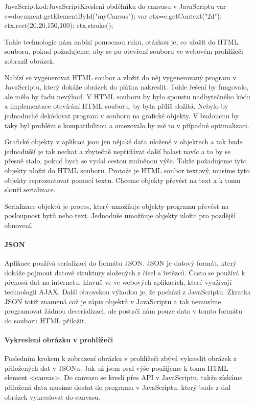 \documentclass[
  field=inf,
  biblatex,
  glossaries,
  index
]{kidiplom}
\begin{document}
\begin{kicode}{JavaScript}{kod:JavaScript}{Kreslení obdélníku do canvasu v JavaScriptu}
var c=document.getElementById("myCanvas");
var ctx=c.getContext("2d");
ctx.rect(20,20,150,100);
ctx.stroke();
\end{kicode}

Tahle technologie nám nabízí pomocnou ruku, otázkou je, co uložit do HTML souboru, pokud požadujeme, aby se po otevření souboru ve webovém prohlížeči zobrazil obrázek.

Nabízí se vygenerovat HTML soubor a vložit do něj vygenerovaný program v JavaScriptu, který dokáže obrázek do plátna nakreslit. Tohle řešení by fungovalo, ale mělo by řadu nevýhod. V HTML souboru by bylo spoustu nadbytečného kódu a implementace otevírání HTML souboru, by byla příliš složitá. Nebylo by jednoduché dekódovat program v souboru na grafické objekty. V budoucnu by taky byl problém s kompatibilitou a omezovalo by mě to v případné optimalizaci.

Grafické objekty v aplikaci jsou jen nějaké data uložené v objektech a tak bude jednodušší je tak nechat a zbytečně nepřidávat další balast navíc a to by se přesně stalo, pokud bych se vydal cestou zmíněnou výše. Takže požadujeme tyto objekty uložit do HTML souboru. Protože je HTML soubor textový, musíme tyto objekty reprezentovat pomocí textu. Chceme objekty převést na text a k tomu slouží serializace.

Serializace objektů je proces, který umožňuje objekty programu převést na posloupnost bytů nebo text. Jednoduše umožňuje objekty uložit pro pozdější obnovení.



\paragraph{JSON}
Aplikace používá serializaci do formátu JSON. JSON je datový formát, který dokáže pojmout datové struktury složených z čísel a řetězců. Často se používá k přenosů dat na internetu, hlavně ve ve webových aplikacích, které využívají technologii AJAX. Další obrovskou výhodou je, že pochází z JavaScriptu. Zkratka JSON totiž znamená  což je zápis objektů v JavaScriptu a tak nemusíme programovat žádnou deserializaci, ale postačí nám pouze data v tomto formátu do souboru HTML přiložit.


\paragraph{Vykreslení obrázku v prohlížeči}
Posledním krokem k zobrazení obrázku v prohlížeči zbývá vykreslit obrázek z přiložených dat v JSONu. Jak už jsem psal výše použijeme k tomu HTML element <canvas>. Do canvasu se kreslí přes API v JavaScriptu, takže získáme přiložená data musíme dostat do programu v JavaScriptu, který bude z dal obrázek vykreslovat do canvasu. 
\end{document}
